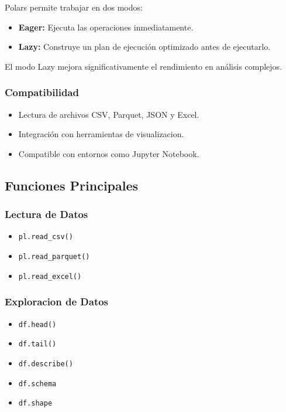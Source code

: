 Polars permite trabajar en dos modos:

\begin{itemize}
    \item \textbf{Eager:} Ejecuta las operaciones inmediatamente.
    \item \textbf{Lazy:} Construye un plan de ejecución optimizado antes de ejecutarlo.
\end{itemize}

El modo Lazy mejora significativamente el rendimiento en análisis complejos.

\subsubsection{Compatibilidad}

\begin{itemize}
    \item Lectura de archivos CSV, Parquet, JSON y Excel.
    \item Integración con herramientas de visualizacion.
    \item Compatible con entornos como Jupyter Notebook.
\end{itemize}

\subsection{Funciones Principales}

\subsubsection{Lectura de Datos}

\begin{itemize}
    \item \texttt{pl.read\_csv()}
    \item \texttt{pl.read\_parquet()}
    \item \texttt{pl.read\_excel()}
\end{itemize}

\subsubsection{Exploracion de Datos}

\begin{itemize}
    \item \texttt{df.head()}
    \item \texttt{df.tail()}
    \item \texttt{df.describe()}
    \item \texttt{df.schema}
    \item \texttt{df.shape}
\end{itemize}

